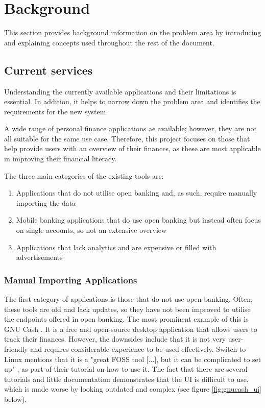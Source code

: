 \chapter{Background}
\label{ch:background}

This section provides background information on the problem area by introducing and explaining concepts used throughout the rest of the document.

\section{Current services}
\label{sec:current-services}
Understanding the currently available applications and their limitations is essential. In addition, it helps to narrow down the problem area and identifies the requirements for the new system.

A wide range of personal finance applications ae available; however, they are not all suitable for the same use case. Therefore, this project focuses on those that help provide users with an overview of their finances, as these are most applicable in improving their financial literacy. 

The three main categories of the existing tools are:
\begin{enumerate}
    \item Applications that do not utilise open banking and, as such, require manually importing the data
    \item Mobile banking applications that do use open banking but instead often focus on single accounts, so not an extensive overview
    \item Applications that lack analytics and are expensive or filled with advertisements
\end{enumerate}

\subsection{Manual Importing Applications}
\label{sec:manual-importing-applications}
The first category of applications is those that do not use open banking. Often, these tools are old and lack updates, so they have not been improved to utilise the endpoints offered in open banking. The most prominent example of this is GNU Cash \cite{GNUCash}. It is a free and open-source desktop application that allows users to track their finances. However, the downsides include that it is not very user-friendly and requires considerable experience to be used effectively. Switch to Linux mentions that it is a "great FOSS tool [...], but it can be complicated to set up" \cite{GNUCashSwitchedToLinux}, as part of their tutorial on how to use it. The fact that there are several tutorials and little documentation demonstrates that the UI is difficult to use, which is made worse by looking outdated and complex (see figure \ref{fig:gnucash_ui} below). 

